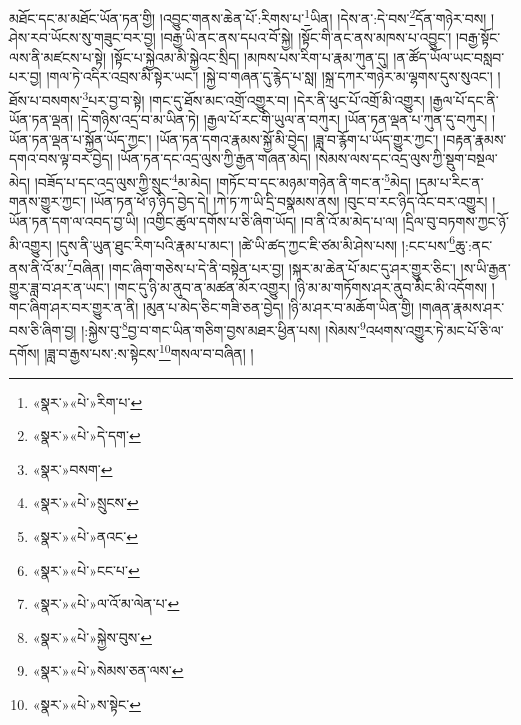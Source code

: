 མཐོང་དང་མ་མཐོང་ཡོན་ཏན་གྱི། །འབྱུང་གནས་ཆེན་པོ་:རིགས་པ་\footnote{«སྣར་»«པེ་»རིག་པ་}ཡིན། །དེས་ན་:དེ་བས་\footnote{«སྣར་»«པེ་»དེ་དག་}དོན་གཉེར་བས། །ཤེས་རབ་ཡོངས་སུ་གཟུང་བར་བྱ། །བརྒྱ་ཡི་ནང་ནས་དཔའ་བོ་སྐྱེ། །སྟོང་གི་ནང་ནས་མཁས་པ་འབྱུང་། །བརྒྱ་སྟོང་ལས་ནི་མཛངས་པ་སྟེ། །སྟོང་པ་སྐྱེའམ་མི་སྐྱེའང་སྲིད། །མཁས་པས་རིག་པ་རྣམ་ཀུན་དུ། །ན་ཚོད་ཡོལ་ཡང་བསླབ་པར་བྱ། །གལ་ཏེ་འདིར་འབྲས་མི་སྟེར་ཡང་། །སྐྱེ་བ་གཞན་དུ་རྙེད་པ་སླ། །སྐྲ་དཀར་གཉེར་མ་ལྷགས་དུས་སུའང་། །ཐོས་པ་བསགས་\footnote{«སྣར་»བསག་}པར་བྱ་བ་སྟེ། །གང་དུ་ཐོས་མང་འགྲོ་འགྱུར་བ། །དེར་ནི་ཕུང་པོ་འགྲོ་མི་འགྱུར། །རྒྱལ་པོ་དང་ནི་ཡོན་ཏན་ལྡན། །དེ་གཉིས་འདྲ་བ་མ་ཡིན་ཏེ། །རྒྱལ་པོ་རང་གི་ཡུལ་ན་བཀུར། །ཡོན་ཏན་ལྡན་པ་ཀུན་དུ་བཀུར། །ཡོན་ཏན་ལྡན་པ་སྐྱོན་ཡོད་ཀྱང་། །ཡོན་ཏན་དགའ་རྣམས་སྐྱོ་མི་བྱེད། །ཟླ་བ་རྙོག་པ་ཡོད་གྱུར་ཀྱང་། །བརྟན་རྣམས་དགའ་བས་ལྟ་བར་བྱེད། །ཡོན་ཏན་དང་འདྲ་ལུས་ཀྱི་རྒྱན་གཞན་མེད། །སེམས་ལས་དང་འདྲ་ལུས་ཀྱི་སྡུག་བསྔལ་མེད། །བཟོད་པ་དང་འདྲ་ལུས་ཀྱི་སྲུང་\footnote{«སྣར་»«པེ་»སྲུངས་}མ་མེད། །གཏོང་བ་དང་མཉམ་གཉེན་ནི་གང་ན་\footnote{«སྣར་»«པེ་»ནའང་}མེད། །དམ་པ་རིང་ན་གནས་གྱུར་ཀྱང་། །ཡོན་ཏན་ཕོ་ཉ་ཉིད་བྱེད་དེ། །ཀེ་ཏ་ཀ་ཡི་དྲི་བསྣམས་ནས། །བུང་བ་རང་ཉིད་འོང་བར་འགྱུར། །ཡོན་ཏན་དག་ལ་འབད་བྱ་ཡི། །འགྱིང་ཚུལ་དགོས་པ་ཅི་ཞིག་ཡོད། །བ་ནི་འོ་མ་མེད་པ་ལ། །དྲིལ་བུ་བཏགས་ཀྱང་ཉོ་མི་འགྱུར། །དུས་ནི་ཡུན་ཐུང་རིག་པའི་རྣམ་པ་མང་། །ཚེ་ཡི་ཚད་ཀྱང་ཇི་ཙམ་མི་ཤེས་པས། །:ངང་པས་\footnote{«སྣར་»«པེ་»ངང་པ་}ཆུ་:ནང་ནས་ནི་འོ་མ་\footnote{«སྣར་»«པེ་»ལ་འོ་མ་ལེན་པ་}བཞིན། །གང་ཞིག་གཅེས་པ་དེ་ནི་བསྟེན་པར་བྱ། །སྐར་མ་ཆེན་པོ་མང་དུ་ཤར་གྱུར་ཅིང་། །ས་ཡི་རྒྱན་གྱུར་ཟླ་བ་ཤར་ན་ཡང་། །གང་དུ་ཉི་མ་ནུབ་ན་མཚན་མོར་འགྱུར། །ཉི་མ་མ་གཏོགས་ཤར་ནུབ་མིང་མི་འདོགས། །གང་ཞིག་ཤར་བར་གྱུར་ན་ནི། །མུན་པ་མེད་ཅིང་གཟི་ཅན་བྱེད། །ཉི་མ་ཤར་བ་མཆོག་ཡིན་གྱི། །གཞན་རྣམས་ཤར་བས་ཅི་ཞིག་བྱ། །:སྐྱེས་བུ་\footnote{«སྣར་»«པེ་»སྐྱེས་བུས་}བྱ་བ་གང་ཡིན་གཅིག་བྱས་མཐར་ཕྱིན་པས། །སེམས་\footnote{«སྣར་»«པེ་»སེམས་ཅན་ལས་}འཕགས་འགྱུར་ཏེ་མང་པོ་ཅི་ལ་དགོས། །ཟླ་བ་རྒྱས་པས་:ས་སྟེངས་\footnote{«སྣར་»«པེ་»ས་སྟེང་}གསལ་བ་བཞིན། །
